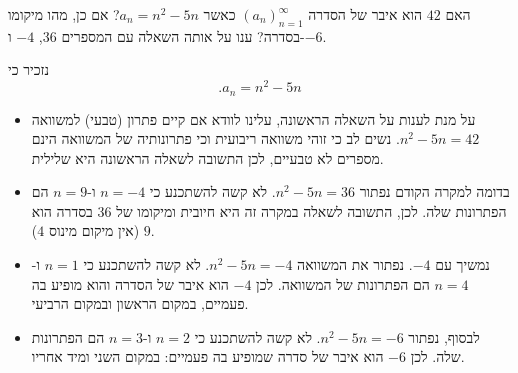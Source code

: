האם
$42$
הוא איבר של הסדרה
$(a_n)_{n=1}^{\infty}$
כאשר
$a_n=n^2-5n$?
אם כן, מהו מיקומו בסדרה? ענו על אותה השאלה עם המספרים
$36$, $-4$
ו-$-6$.
\begin{solbox}
נזכיר כי
$$.a_n=n^2-5n$$
\begin{itemize}
\item
על מנת לענות על השאלה הראשונה, עלינו לוודא אם קיים פתרון (טבעי) למשוואה
$n^2-5n=42$.
נשים לב כי זוהי משוואה ריבועית וכי פתרונותיה של המשוואה הינם מספרים לא טבעיים, לכן התשובה לשאלה הראשונה היא שלילית.
\item
בדומה למקרה הקודם נפתור
$n^2-5n=36$.
לא קשה להשתכנע כי
$n=-4$
ו-$n=9$
הם הפתרונות שלה. לכן, התשובה לשאלה במקרה זה היא חיובית ומיקומו של
$36$
בסדרה הוא
$9$
(אין מיקום מינוס $4$).
\item
נמשיך עם
$-4$.
נפתור את המשוואה
$n^2-5n=-4$.
לא קשה להשתכנע כי
$n=1$
ו-$n=4$
הם הפתרונות של המשוואה. לכן
$-4$
הוא איבר של הסדרה והוא מופיע בה פעמיים, במקום הראשון ובמקום הרביעי.
\item
לבסוף, נפתור
$n^2-5n=-6$.
לא קשה להשתכנע כי
$n=2$
ו-$n=3$
הם הפתרונות שלה. לכן
$-6$
הוא איבר של סדרה שמופיע בה פעמיים: במקום השני ומיד אחריו.
\end{itemize}
\end{solbox}
